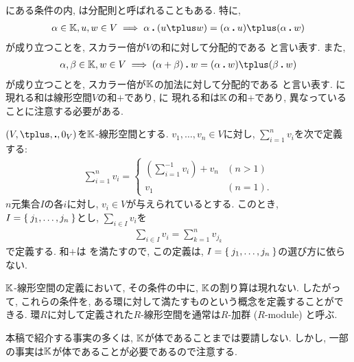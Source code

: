 \begin{remark}
にある条件の内,
は分配則と呼ばれることもある.
特に, 
\begin{align*}
\alpha\in \KK,u,w\in V \implies \alpha\act (u\plus w)=(\alpha\act u)\plus (\alpha\act w)
\end{align*}
が成り立つことを, スカラー倍が$V$の和に対して分配的である
と言い表す.
また,  
\begin{align*}
\alpha,\beta\in\KK, w\in V\implies (\alpha+\beta)\act w=(\alpha\act w)\plus (\beta\act w)
\end{align*}
が成り立つことを, スカラー倍が$\mathbb{K}$の加法に対して分配的である
と言い表す.
に
現れる和は線形空間$V$の和$\plus$であり,
 に
現れる和は$\mathbb{K}$の和$+$であり,
異なっていることに注意する必要がある.
\end{remark}

\begin{remark}
$(V,\plus,\act,0_V)$を$\mathbb{K}$-線形空間とする.
$v_1,\ldots,v_n \in V$に対し,
$\sum_{i=1}^n v_i$を次で定義する:
\begin{align*}
\sum_{i=1}^n v_i
=
\begin{cases}
\left(\sum_{i=1}^{-1} v_i\right)\plus v_n& (n>1)\\
v_1&(n=1).
\end{cases}
\end{align*}
$n$元集合$I$の各$i$に対し, $v_i\in V$が与えられているとする.
このとき, $I=\Set{j_1,\ldots,j_n}$とし,
$\sum_{i\in I} v_i$を
\begin{align*}
\sum_{i\in I} v_i =
\sum_{k=1}^n v_{j_k}
\end{align*}
で定義する.
和$\plus$は
を満たすので,
この定義は,
$I=\Set{j_1,\ldots,j_n}$の選び方に依らない.
\end{remark}

\begin{remark}
  $\mathbb{K}$-線形空間の定義において,
  その条件の中に, $\mathbb{K}$の割り算は現れない.
  したがって,
  これらの条件を, ある環に対して満たすものという概念を定義することができる.
  環$R$に対して定義された$R$-線形空間を通常は$R$-加群 ($R$-module) と呼ぶ.
\end{remark}

\begin{note}
本稿で紹介する事実の多くは, $\mathbb{K}$が体であることまでは要請しない.
しかし, 一部の事実は$\mathbb{K}$が体であることが必要であるので注意する.
\end{note}

